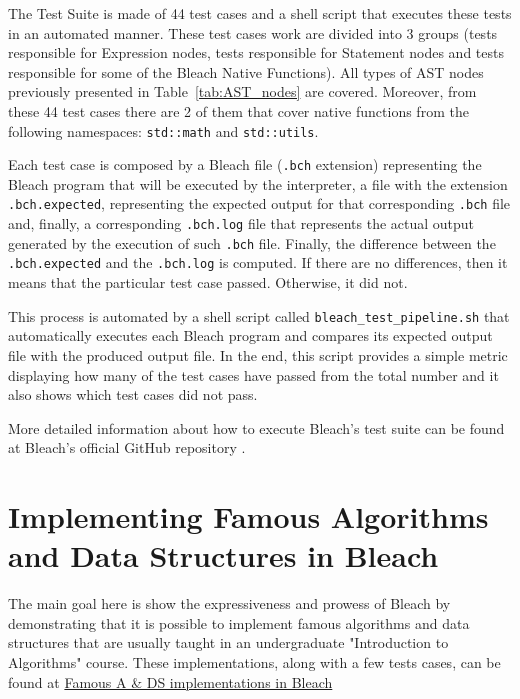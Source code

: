 The Test Suite is made of 44 test cases and a shell script that executes these tests in an automated manner. These test cases work are divided into 3 groups (tests responsible for Expression nodes, tests responsible for Statement nodes and tests responsible for some of the Bleach Native Functions). All types of AST nodes previously presented in Table~\ref{tab:AST_nodes} are covered. Moreover, from these 44 test cases there are 2 of them that cover native functions from the following namespaces: \texttt{std::math} and \texttt{std::utils}.

Each test case is composed by a Bleach file (\texttt{.bch} extension) representing the Bleach program that will be executed by the interpreter, a file with the extension 
 \texttt{.bch.expected}, representing the expected output for that corresponding \texttt{.bch} file and, finally, a corresponding \texttt{.bch.log} file that represents the actual output generated by the execution of such \texttt{.bch} file. Finally, the difference between the \texttt{.bch.expected} and the \texttt{.bch.log} is computed. If there are no differences, then it means that the particular test case passed. Otherwise, it did not.

 This process is automated by a shell script called \texttt{bleach\_test\_pipeline.sh} that automatically executes each Bleach program and compares its expected output file with the produced output file. In the end, this script provides a simple metric displaying how many of the test cases have passed from the total number and it also shows which test cases did not pass.

 More detailed information about how to execute Bleach's test suite can be found at Bleach's official GitHub repository \cite{bleach_lang_git_repo}.


\section{Implementing Famous Algorithms and Data Structures in Bleach}
The main goal here is show the expressiveness and prowess of Bleach by demonstrating that it is possible to implement famous algorithms and data structures that are usually taught in an undergraduate "Introduction to Algorithms" course. These implementations, along with a few tests cases, can be found at \href{https://github.com/vmmc2/Bleach/tree/main/tests/algorithms_and_data_structures}{Famous A \& DS implementations in Bleach}


